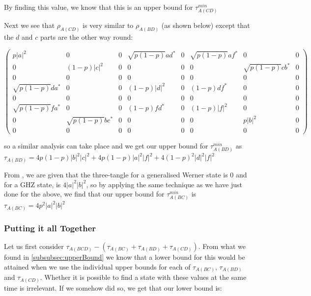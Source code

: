 \documentclass[12pt,a4paper]{article}
\numberwithin{equation}{section}
\begin{document}
By finding this value, we know that this is an upper bound for $\tau_{A(CD)}^{min}$

\vskip 2mm

Next we see that $\rho_{A(CD)}$ is very similar to $\rho_{A(BD)}$ (as shown below) except that the $d$ and $c$ parts are the other way round:

\vskip 2mm

\noindent $\begin{pmatrix} p|a|^2 & 0 & 0 & \sqrt{p(1-p)}ad^* & 0 & \sqrt{p(1-p)}af^* & 0 & 0 \\ 0 & (1-p)|c|^2 & 0 & 0 & 0 & 0 & \sqrt{p(1-p)}cb^* & 0 \\ 0 & 0 & 0 & 0 & 0 & 0 & 0 & 0 \\ \sqrt{p(1-p)}da^* & 0 & 0 & (1-p)|d|^2 & 0 & (1-p)df^* & 0 & 0 \\ 0 & 0 & 0 & 0 & 0 & 0 & 0 & 0 \\ \sqrt{p(1-p)}fa^* & 0 & 0 & (1-p)fd^* & 0 & (1-p)|f|^2 & 0 & 0 \\ 0 & \sqrt{p(1-p)}bc^* & 0 & 0 & 0 & 0 & p|b|^2 & 0 \\ 0 & 0 & 0 & 0 & 0 & 0 & 0 & 0 \end{pmatrix}$

\vskip 2mm

so a similar analysis can take place and we get our upper bound for $\tau_{A(BD)}^{min}$ as $\tau_{A(BD)} = 4p(1-p)|b|^2|c|^2 + 4p(1-p)|a|^2|f|^2 + 4(1-p)^2|d|^2|f|^2$

From \cite{EOSU}, we are given that the three-tangle for a generalised Werner state is $0$ and for a GHZ state, is $4|a|^2|b|^2$, so by applying the same technique as we have just done for the above, we find that our upper bound for $\tau_{A(BC)}^{min}$ is $\tau_{A(BC)} = 4p^2|a|^2|b|^2$

\newpage

\subsubsection{Putting it all Together}
\label{subsubsec:comingTogether}

Let us first consider $\tau_{A(BCD)} - (\tau_{A(BC)} + \tau_{A(BD)} + \tau_{A(CD)})$. From what we found in \ref{subsubsec:upperBound} we know that a lower bound for this would be attained when we use the individual upper bounds for each of $\tau_{A(BC)}$, $\tau_{A(BD)}$ and $\tau_{A(CD)}$. Whether it is possible to find a state with these values at the same time is irrelevant. If we somehow did so, we get that our lower bound is:
\end{document}
